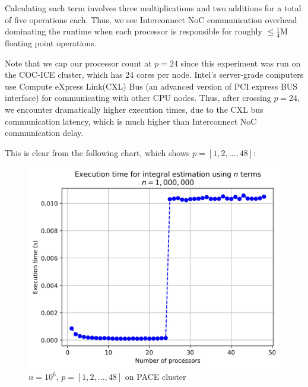 \documentclass{article}
\begin{document}
Calculating each term involves three multiplications and two additions for a total of five operations each.
Thus, we see Interconnect NoC communication overhead dominating the runtime when each processor is responsible for roughly $\leq \frac{1}{4}$M floating point operations.

\hbox{}
Note that we cap our processor count at $p=24$ since this experiment was run on the COC-ICE cluster, which has 24 cores per node. Intel's server-grade computers use Compute eXpress Link(CXL) Bus (an advanced version of PCI express BUS interface) for communicating with other CPU nodes. 
Thus, after crossing $p=24$, we encounter dramatically higher execution times, due to the CXL bus communication latency, which is much higher than Interconnect NoC communication delay.

This is clear from the following chart, which shows $p=[1,2,...,48]$:

\begin{figure}[htb]
    \centering \includegraphics[scale = 0.75]{report_chart_n_1M_p_48_PACE.jpg}
    \caption{$n=10^6$, $p=[1,2,...,48]$ on PACE cluster}
    \label{fig:figure2}
\end{figure}
\end{document}
